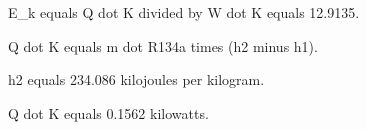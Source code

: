 E_k equals Q dot K divided by W dot K equals 12.9135.  

Q dot K equals m dot R134a times (h2 minus h1).  

h2 equals 234.086 kilojoules per kilogram.  

Q dot K equals 0.1562 kilowatts.